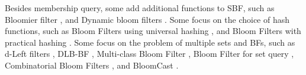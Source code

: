 Besides membership query, some add additional functions to SBF, such as Bloomier filter \cite{Bloomier}, and Dynamic bloom filters \cite{DynamicBF}. 
Some focus on the choice of hash functions, such as Bloom Filters using universal hashing \cite{universalHash}, and Bloom Filters with practical hashing \cite{partitionHashBF}.
Some focus on the problem of multiple sets and BFs, such as 
d-Left filters \cite{dleft}, DLB-BF \cite{songV6}, Multi-class
Bloom Filter \cite{BFDanLi},  Bloom Filter for set query \cite{setqueryBF}, Combinatorial Bloom Filters \cite{combineBF}, and BloomCast \cite{BloomCast}.





%




